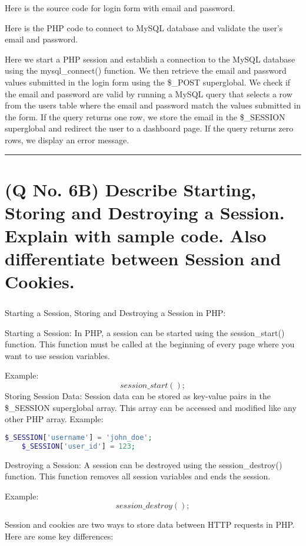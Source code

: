 \documentclass[11pt]{article}
\begin{document}
Here is the source code for login form with email and password.


Here is the PHP code to connect to MySQL database and validate the user's email and password.


Here we start a PHP session and establish a connection to the MySQL database using the mysql\_connect() function. We then retrieve the email and password values submitted in the login form using the \$\_POST superglobal. We check if the email and password are valid by running a MySQL query that selects a row from the users table where the email and password match the values submitted in the form. If the query returns one row, we store the email in the \$\_SESSION superglobal and redirect the user to a dashboard page. If the query returns zero rows, we display an error message.


\noindent\rule{\linewidth}{0.4pt}
\section{(Q No. 6B) Describe Starting, Storing and Destroying a Session. Explain with sample code. Also differentiate between Session and Cookies.}
\subparagraph{}
Starting a Session, Storing and Destroying a Session in PHP:

Starting a Session:
In PHP, a session can be started using the session\_start() function. This function must be called at the beginning of every page where you want to use session variables.

Example:
\[session\_start();\]
Storing Session Data:
Session data can be stored as key-value pairs in the \$\_SESSION superglobal array. This array can be accessed and modified like any other PHP array.
Example:
\begin{lstlisting}[language=php]
    $_SESSION['username'] = 'john_doe';
    $_SESSION['user_id'] = 123;
\end{lstlisting}

Destroying a Session:
A session can be destroyed using the session\_destroy() function. This function removes all session variables and ends the session.

Example:
\[session\_destroy();
\]

Session and cookies are two ways to store data between HTTP requests in PHP. Here are some key differences:
\end{document}
